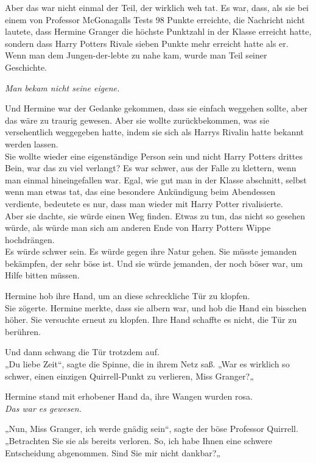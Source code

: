 {Aber das war nicht einmal der Teil, der wirklich weh tat. Es war, dass, als sie bei einem von Professor McGonagalls Tests 98 Punkte erreichte, die Nachricht nicht lautete, dass Hermine Granger die höchste Punktzahl in der Klasse erreicht hatte, sondern dass Harry Potters Rivale sieben Punkte mehr erreicht hatte als er.\\ Wenn man dem Jungen-der-lebte zu nahe kam, wurde man Teil seiner Geschichte.

\emph{Man bekam nicht seine eigene.}

Und Hermine war der Gedanke gekommen, dass sie einfach weggehen sollte, aber das wäre zu traurig gewesen. Aber sie wollte zurückbekommen, was sie versehentlich weggegeben hatte, indem sie sich als Harrys Rivalin hatte bekannt werden lassen.\\ Sie wollte wieder eine eigenständige Person sein und nicht Harry Potters drittes Bein, war das zu viel verlangt? Es war schwer, aus der Falle zu klettern, wenn man einmal hineingefallen war. Egal, wie gut man in der Klasse abschnitt, selbst wenn man etwas tat, das eine besondere Ankündigung beim Abendessen verdiente, bedeutete es nur, dass man wieder mit Harry Potter rivalisierte.\\ Aber sie dachte, sie würde einen Weg finden. Etwas zu tun, das nicht so gesehen würde, als würde man sich am anderen Ende von Harry Potters Wippe hochdrängen.\\ Es würde schwer sein. Es würde gegen ihre Natur gehen. Sie müsste jemanden bekämpfen, der sehr böse ist. Und sie würde jemanden, der noch böser war, um Hilfe bitten müssen.

Hermine hob ihre Hand, um an diese schreckliche Tür zu klopfen.\\ Sie zögerte. Hermine merkte, dass sie albern war, und hob die Hand ein bisschen höher. Sie versuchte erneut zu klopfen. Ihre Hand schaffte es nicht, die Tür zu berühren.

Und dann schwang die Tür trotzdem auf.\\ „Du liebe Zeit“, sagte die Spinne, die in ihrem Netz saß. „War es wirklich so schwer, einen einzigen Quirrell-Punkt zu verlieren, Miss Granger?„

Hermine stand mit erhobener Hand da, ihre Wangen wurden rosa.\\ \emph{Das war es gewesen.}

„Nun, Miss Granger, ich werde gnädig sein“, sagte der böse Professor Quirrell.\\ „Betrachten Sie sie als bereits verloren. So, ich habe Ihnen eine schwere Entscheidung abgenommen. Sind Sie mir nicht dankbar?„

}
